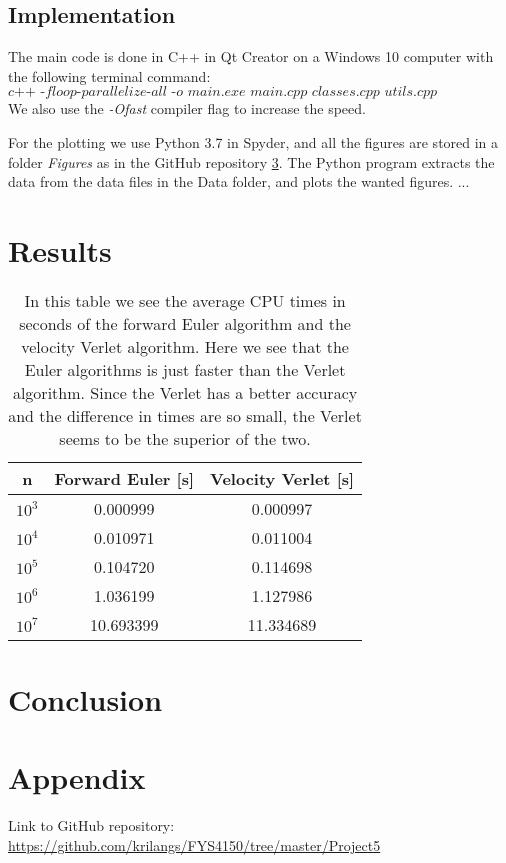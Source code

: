 \documentclass[12pt,a4paper,english]{article}
\begin{document}
\subsection{Implementation}
\label{subsect:Implementation}
The main code is done in C++ in Qt Creator on a Windows 10 computer with the following terminal command: \[\textit{c++ -floop-parallelize-all -o main.exe main.cpp classes.cpp utils.cpp SolarSystem.cpp}\]
We also use the \textit{-Ofast} compiler flag to increase the speed.

For the plotting we use Python 3.7 in Spyder, and all the figures are stored in a folder \textit{Figures} as in the GitHub repository \ref{sect:appendix}. The Python program extracts the data from the data files in the Data folder, and plots the wanted figures.
...




\section{Results}
\label{sect:Results}
\begin{table}[htbp]
	\centering
	\begin{tabular}{ |c|c|c| }
		\hline \rule{0pt}{13pt}
		n & Forward Euler [s] & Velocity Verlet [s] \\
		\hline \rule{0pt}{13pt}
		$10^3$ & 0.000999 & 0.000997  \\
		\hline \rule{0pt}{13pt}
		$10^4$ & 0.010971 & 0.011004 \\
		\hline \rule{0pt}{13pt}
		$10^5$ & 0.104720 & 0.114698 \\
		\hline \rule{0pt}{13pt}
		$10^6$ & 1.036199 & 1.127986 \\
		\hline \rule{0pt}{13pt}
		$10^7$ & 10.693399 & 11.334689 \\
		\hline 
	\end{tabular}	
	\caption{In this table we see the average CPU times in seconds of the forward Euler algorithm and the velocity Verlet algorithm. Here we see that the Euler algorithms is just faster than the Verlet algorithm. Since the Verlet has a better accuracy and the difference in times are so small, the Verlet seems to be the superior of the two.}
	\label{tab:times}
\end{table}
\section{Conclusion}
\label{sect:Conclusion}

\appendix
\section{Appendix}
\label{sect:appendix}
Link to GitHub repository:\\
\url{https://github.com/krilangs/FYS4150/tree/master/Project5}



\end{document}
